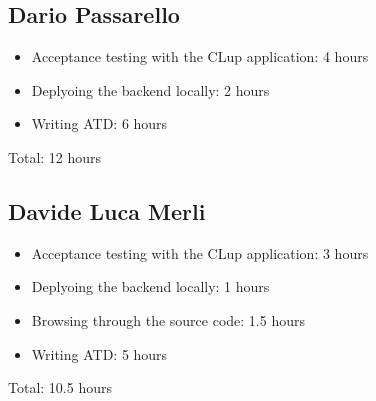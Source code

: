 \subsection{Dario Passarello}
\begin{itemize}
    \item Acceptance testing with the CLup application: 4 hours
    \item Deplyoing the backend locally: 2 hours
    \item Writing ATD: 6 hours
\end{itemize}
Total: 12 hours

\subsection{Davide Luca Merli}
\begin{itemize}
    \item Acceptance testing with the CLup application: 3 hours
    \item Deplyoing the backend locally: 1 hours
    \item Browsing through the source code: 1.5 hours
    \item Writing ATD: 5 hours
\end{itemize}
Total: 10.5 hours
